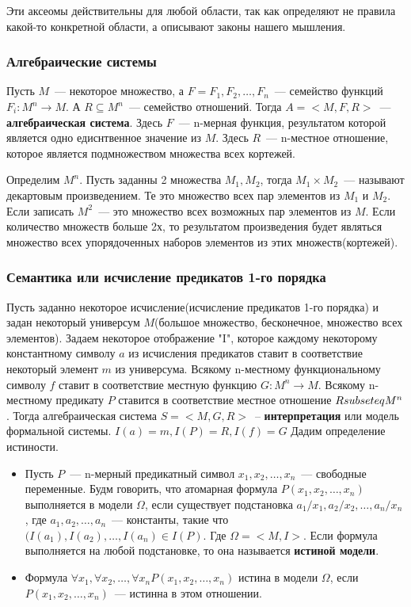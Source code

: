 Эти аксеомы действительны для любой области, так как определяют не правила какой-то конкретной области, а описывают законы нашего мышления.

\subsubsection{Алгебраические системы}
Пусть $M$~--- некоторое множество, а $F={F_1,F_2,\ldots,F_n}$~--- семейство функций $F_i:M^n\rightarrow{}M$. А $R\subseteq{}M^n$~--- семейство отношений. Тогда $A=<M,F,R>$~--- \textbf{алгебраическая система}. Здесь $F$~--- n-мерная функция, результатом которой является одно едиснтвенное значение из $M$. Здесь $R$~--- n-местное отношение, которое является подмножеством множества всех кортежей.

Определим $M^n$. Пусть заданны 2 множества $M_1,M_2$, тогда $M_1\times{}M_2$~--- называют декартовым произведением. Те это множество всех пар элементов из $M_1$ и $M_2$. Если записать $M^2$~--- это множество всех возможных пар элементов из $M$. Если количество множеств больше 2х, то результатом произведения будет являться множество всех упорядоченных наборов элементов из этих множеств(кортежей).

\subsubsection{Семантика или исчисление предикатов 1-го порядка}
Пусть заданно некоторое исчисление(исчисление предикатов 1-го порядка) и задан некоторый универсум $M$(большое множество, бесконечное, множество всех элементов). Задаем некоторое отображение "I", которое каждому некоторому константному символу $a$ из исчисления предикатов ставит в соответствие некоторый элемент $m$ из универсума. Всякому n-местному функциональному символу $f$ ставит в соответствие местную функцию $G:M^n\rightarrow{}M$. Всякому n-местному предикату $P$ ставится в соответствие местное отношение $R\\subseteq{}M^n$. Тогда алгебраическая система $S=<M,G,R>$~-- \textbf{интерпретация} или модель формальной системы. $I(a)=m, I(P)=R, I(f)=G$
Дадим определение истиности. 
\begin{itemize}
\item Пусть $P$~--- n-мерный предикатный символ $x_1,x_2,\ldots,x_n$~--- свободные переменные. Будм говорить, что атомарная формула $P(x_1,x_2,\ldots,x_n)$ выполняется в модели $\Omega$, если существует подстановка $a_1/x_1,a_2/x_2,\ldots,a_n/x_n$, где $a_1,a_2,\ldots,a_n$~--- константы, такие что $(I(a_1),I(a_2),\ldots,I(a_n)\in{}I(P)$. Где $\Omega=<M, I>$. Если формула выполняется на любой подстановке, то она называется \textbf{истиной модели}.

\item Формула $\forall{}x_1,\forall{}x_2,\ldots,\forall{}x_nP(x_1,x_2,\ldots,x_n)$ истина в модели $\Omega$, если $P(x_1,x_2,\ldots,x_n)$~--- истинна в этом отношении.
\end{itemize}

